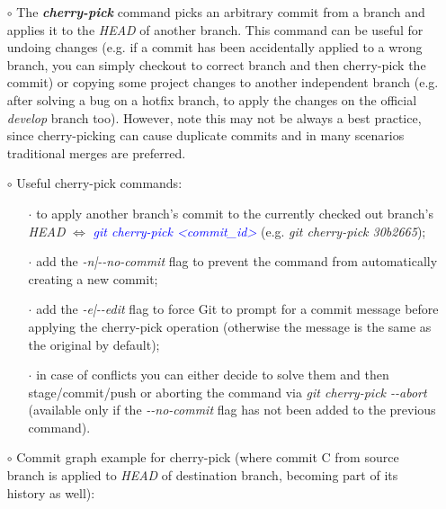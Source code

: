 \documentclass[a4paper,portrait,10pt]{article}   %
\newcommand{\mybulletlvA}{$\circ$}   %
\newcommand{\mybulletlvB}{$\cdot$}   %
\newcommand{\mydiv}{$\Leftrightarrow$ }   %
\newcommand{\mysapo}[1]{\textquotesingle #1\textquotesingle }   %
\newcommand{\mycmd}[1]{\textcolor{blue}{\textit{#1}}}   %
\newcommand{\myparvspace}{\vspace{4mm}}   %
\newcommand{\mytzbrdist}{1.75cm}   %
\begin{document}
\begin{itemize}
\item[\mybulletlvA] The \textbf{\textit{cherry-pick}} command picks an arbitrary commit from a branch and applies it to the \textit{HEAD} of another branch. This command can be useful for undoing changes (e.g. if a commit has been accidentally applied to a wrong branch, you can simply checkout to correct branch and then cherry-pick the commit) or copying some project changes to another independent branch (e.g. after solving a bug on a hotfix branch, to apply the changes on the official \textit{develop} branch too). However, note this may not be always a best practice, since cherry-picking can cause duplicate commits and in many scenarios traditional merges are preferred.
\myparvspace

\item[\mybulletlvA] Useful cherry-pick commands:
\begin{itemize}
  \item[\mybulletlvB] to apply another branch's commit to the currently checked out branch's \textit{HEAD} \mydiv \mycmd{git cherry-pick <commit\_id>} (e.g. \textit{git cherry-pick 30b2665});
  \item[\mybulletlvB] add the \textit{-n|-{}-no-commit} flag to prevent the command from automatically creating a new commit;
  \item[\mybulletlvB] add the \textit{-e|-{}-edit} flag to force Git to prompt for a commit message before applying the cherry-pick operation (otherwise the message is the same as the original by default);
  \item[\mybulletlvB] in case of conflicts you can either decide to solve them and then stage/commit/push or aborting the command via \textit{git cherry-pick -{}-abort} (available only if the \textit{-{}-no-commit} flag has not been added to the previous command).
\end{itemize}
\myparvspace

\item[\mybulletlvA] Commit graph example for cherry-pick (where commit \mysapo{C} from source branch is applied to \textit{HEAD} of destination branch, becoming part of its history as well):
\begin{figure}[h!]
\centering
{}
\end{figure}
\end{itemize}
\end{document}

